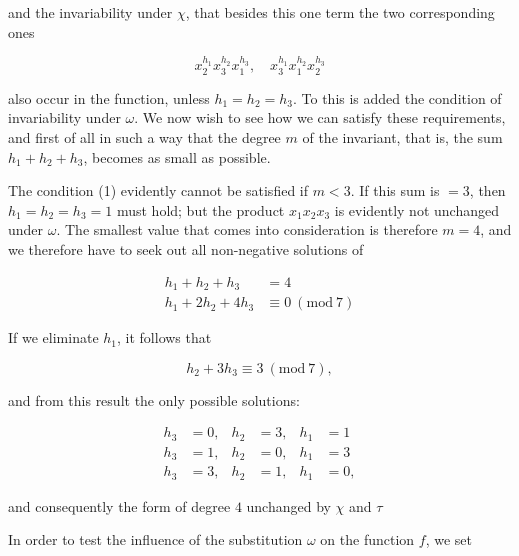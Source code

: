 
and the invariability under $\chi$, that besides this one term the two corresponding ones

\[
x_2^{h_1} x_3^{h_2} x_1^{h_3}, \quad x_3^{h_1} x_1^{h_2} x_2^{h_3}
\]

also occur in the function, unless $h_1 = h_2 = h_3$. To this is added the condition of invariability under $\omega$. We now wish to see how we can satisfy these requirements, and first of all in such a way that the degree $m$ of the invariant, that is, the sum $h_1 + h_2 + h_3$, becomes as small as possible.

The condition (1) evidently cannot be satisfied if $m < 3$. If this sum is $= 3$, then $h_1 = h_2 = h_3 = 1$ must hold; but the product $x_1 x_2 x_3$ is evidently not unchanged under $\omega$. The smallest value that comes into consideration is therefore $m = 4$, and we therefore have to seek out all non-negative solutions of

\[
\begin{aligned}
h_1 + h_2 + h_3 &= 4 \\
h_1 + 2h_2 + 4h_3 &\equiv 0\ (\mathrm{mod}\ 7)
\end{aligned}
\]

If we eliminate $h_1$, it follows that

\[
h_2 + 3h_3 \equiv 3\ (\mathrm{mod}\ 7),
\]

and from this result the only possible solutions:

\[
\begin{aligned}
h_3 &= 0, & h_2 &= 3, & h_1 &= 1 \\
h_3 &= 1, & h_2 &= 0, & h_1 &= 3 \\
h_3 &= 3, & h_2 &= 1, & h_1 &= 0,
\end{aligned}
\]

and consequently the  form of degree $4$ unchanged by $\chi$ and $\tau$


In order to test the influence of the substitution $\omega$ on the function $f$, we set


